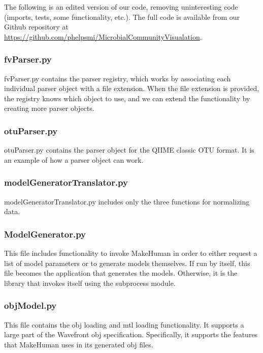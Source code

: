 \documentclass[letterpaper,10pt, onecolumn, draftclsnofoot]{IEEEtran}
\begin{document}
The following is an edited version of our code, removing uninteresting code (imports, tests, some functionality, etc.). The full code is available from our Github repository at \url{https://github.com/phelpsmi/MicrobialCommunityVisualation}.

\subsubsection{fvParser.py}
fvParser.py contains the parser registry, which works by associating each individual parser object with a file extension. When the file extension is provided, the registry knows which object to use, and we can extend the functionality by creating more parser objects.



\subsubsection{otuParser.py}
otuParser.py contains the parser object for the QIIME classic OTU format. It is an example of how a parser object can work.



\subsubsection{modelGeneratorTranslator.py}
modelGeneratorTranslator.py includes only the three functions for normalizing data. 



\subsubsection{ModelGenerator.py}
This file includes functionality to invoke MakeHuman in order to either request a list of model parameters or to generate models themselves. If run by itself, this file becomes the application that generates the models. Otherwise, it is the library that invokes itself using the subprocess module. 



\subsubsection{objModel.py}
This file contains the obj loading and mtl loading functionality. It supports a large part of the Wavefront obj specification. Specifically, it supports the features that MakeHuman uses in its generated obj files.




\end{document}
